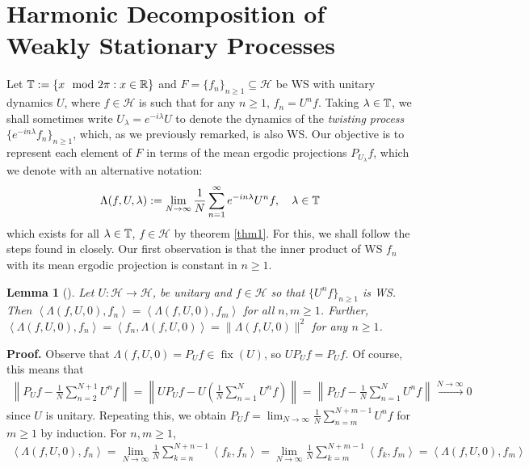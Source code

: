 \documentclass[11pt]{report}
\newcommand{\mc}[1]{\mathcal{#1}}
\newcommand{\ip}[2]{\left\langle#1,#2\right\rangle }
\DeclareMathOperator{\fix}{fix}
\newtheorem{lemma}{Lemma}[section]
\theoremstyle{definition}
\begin{document}
    \section{Harmonic Decomposition of Weakly Stationary Processes}
    Let $\mathbb{T}:=\{x\mod2\pi:x\in\mathbb{R}\}$ and $F=\{f_n\}_{n\geq
    1}\subseteq\mc{H}$ be WS with unitary dynamics $U$, where $f\in\mc{H}$ is
    such that for any $n\geq 1$, $f_n=U^nf$. Taking $\lambda\in\mathbb{T}$, we
    shall sometimes write $U_\lambda=e^{-i\lambda}U$ to denote the dynamics of
    the \textit{twisting process} $\{e^{-in\lambda}f_n\}_{n\geq 1}$, which, as
    we previously remarked, is also WS. Our objective is to represent each
    element of $F$ in terms of the mean ergodic projections $P_{U_\lambda}f$,
    which we denote with an alternative notation:
    \begin{align}
        \Lambda(f,U,\lambda):=\lim_{N\rightarrow\infty}\frac{1}{N}\sum_{n=1}^\infty e^{-in\lambda}U^nf,\quad\lambda\in\mathbb{T}
    \end{align}
    which exists for all $\lambda\in\mathbb{T}$, $f\in\mc{H}$ by theorem \ref{thm1}.
    For this, we shall follow the steps found in\cite[\S6]{Fan_1946} closely. Our first observation is
    that the inner product of WS $f_n$ with its mean ergodic projection is constant in $n\geq 1$.
    \begin{lemma}[{\cite[corollary 4]{Fan_1946}}]\label{lem6}
        Let $U:\mc{H}\rightarrow\mc{H}$, be unitary and $f\in\mc{H}$ so that
        $\{U^nf\}_{n\geq 1}$ is WS. Then
        $\ip{\Lambda(f,U,0)}{f_n}=\ip{\Lambda(f,U,0)}{f_m}$ for all $n,m\geq 1$. Further, $\ip{\Lambda(f,U,0)}{f_n}=\ip{f_n}{\Lambda(f,U,0)}=\|\Lambda(f,U,0)\|^2$ for any $n\geq 1$.
    \end{lemma}
    \noindent\textbf{Proof.} Observe that $\Lambda(f,U,0)=P_Uf\in\fix(U)$, so
    $UP_Uf=P_Uf$. Of course, this means that
    \begin{align*}
        \left\|P_Uf-\frac{1}{N}\sum_{n=2}^{N+1}U^nf\right\|=\left\|UP_Uf-U\left(\frac{1}{N}\sum_{n=1}^{N}U^nf\right)\right\|=\left\|P_Uf-\frac{1}{N}\sum_{n=1}^NU^nf\right\|\overset{N\rightarrow\infty}{\longrightarrow} 0
    \end{align*}
    since $U$ is unitary. Repeating this, we obtain
    $P_Uf=\lim_{N\rightarrow\infty}\frac{1}{N}\sum_{n=m}^{N+m-1}U^nf$ for $m\geq1$
    by induction. For $n,m\geq 1$,
    \begin{align*}
        \ip{\Lambda(f,U,0)}{f_n}=\lim_{N\rightarrow\infty}\frac{1}{N}\sum_{k=n}^{N+n-1}\ip{f_k}{f_n}=\lim_{N\rightarrow\infty}\frac{1}{N}\sum_{k=m}^{N+m-1}\ip{f_k}{f_m}=\ip{\Lambda(f,U,0)}{f_m}
    \end{align*}
\end{document}
